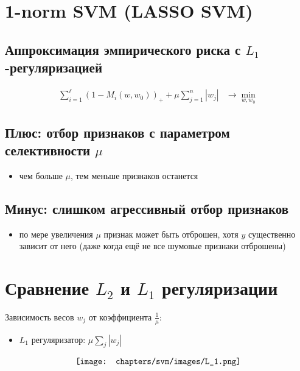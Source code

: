 \setcounter{secnumdepth}{0}

\section{1-norm SVM (LASSO SVM)}
\subsection*{Аппроксимация эмпирического риска с \(L_1\)-регуляризацией}
\begin{align*}
    \sum_{i=1}^{\ell} \left(1 - M_i(w, w_0)\right)_+ + \mu \sum_{j=1}^{n} |w_j| & \rightarrow \min_{w, w_0}
\end{align*}

\subsection*{Плюс: отбор признаков с параметром селективности \(\mu\)}
\begin{itemize}
    \item чем больше \(\mu\), тем меньше признаков останется
\end{itemize}

\subsection*{Минус: слишком агрессивный отбор признаков}
\begin{itemize}
    \item по мере увеличения \(\mu\) признак может быть отброшен, хотя $y$ существенно зависит от него (даже когда ещё не все шумовые признаки отброшены)
\end{itemize}

\newline
\newline

\section{Сравнение \(L_2\) и \(L_1\) регуляризации}

Зависимость весов \(w_j\) от коэффициента \(\frac{1}{\mu}\):

\begin{itemize}
    \item \(L_1\) регуляризатор: \(\mu \sum_{j} |w_j|\)
\end{itemize}

\begin{align*}
    \centering
    \texttt{[image: chapters/svm/images/L\_1.png]}
    \label{fig:image}    
\end{align*}

